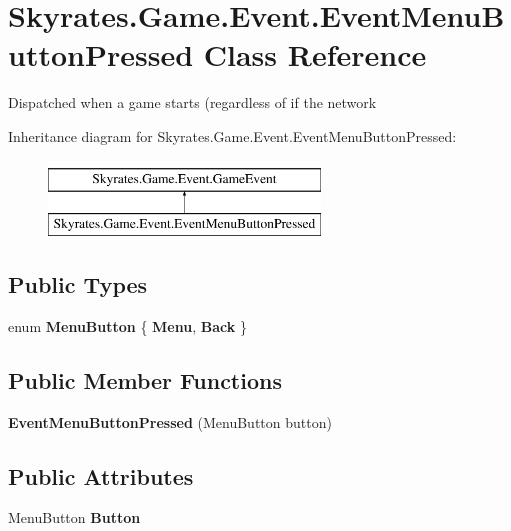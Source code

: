 \hypertarget{class_skyrates_1_1_game_1_1_event_1_1_event_menu_button_pressed}{\section{Skyrates.\-Game.\-Event.\-Event\-Menu\-Button\-Pressed Class Reference}
\label{class_skyrates_1_1_game_1_1_event_1_1_event_menu_button_pressed}
}


Dispatched when a game starts (regardless of if the network  


Inheritance diagram for Skyrates.\-Game.\-Event.\-Event\-Menu\-Button\-Pressed\-:\begin{figure}[H]
\begin{center}
\leavevmode
\includegraphics[height=2.000000cm]{class_skyrates_1_1_game_1_1_event_1_1_event_menu_button_pressed}
\end{center}
\end{figure}
\subsection*{Public Types}
\begin{DoxyCompactItemize}
\item 
enum {\bfseries Menu\-Button} \{ {\bfseries Menu}, 
{\bfseries Back}
 \}
\end{DoxyCompactItemize}
\subsection*{Public Member Functions}
\begin{DoxyCompactItemize}
\item 
\hypertarget{class_skyrates_1_1_game_1_1_event_1_1_event_menu_button_pressed_ab785f55dc36b059733c6331a00e4dc03}{{\bfseries Event\-Menu\-Button\-Pressed} (Menu\-Button button)}\label{class_skyrates_1_1_game_1_1_event_1_1_event_menu_button_pressed_ab785f55dc36b059733c6331a00e4dc03}

\end{DoxyCompactItemize}
\subsection*{Public Attributes}
\begin{DoxyCompactItemize}
\item 
\hypertarget{class_skyrates_1_1_game_1_1_event_1_1_event_menu_button_pressed_a6df4fc97581b70819e09c8803bbc0558}{Menu\-Button {\bfseries Button}}\label{class_skyrates_1_1_game_1_1_event_1_1_event_menu_button_pressed_a6df4fc97581b70819e09c8803bbc0558}

\end{DoxyCompactItemize}


